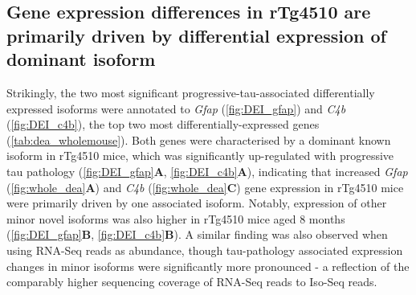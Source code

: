 \subsection{Gene expression differences in rTg4510 are primarily driven by differential expression of dominant isoform}
Strikingly, the two most significant progressive-tau-associated differentially expressed isoforms were annotated to \textit{Gfap} (\cref{fig:DEI_gfap}) and \textit{C4b} (\cref{fig:DEI_c4b}), the top two most differentially-expressed genes (\cref{tab:dea_wholemouse}). Both genes were characterised by a dominant known isoform in rTg4510 mice, which was significantly up-regulated with progressive tau pathology (\cref{fig:DEI_gfap}\textbf{A}, \cref{fig:DEI_c4b}\textbf{A}), indicating that increased \textit{Gfap} (\cref{fig:whole_dea}\textbf{A}) and \textit{C4b} (\cref{fig:whole_dea}\textbf{C}) gene expression in rTg4510 mice were primarily driven by one associated isoform. Notably, expression of other minor novel isoforms was also higher in rTg4510 mice aged 8 months (\cref{fig:DEI_gfap}\textbf{B}, \cref{fig:DEI_c4b}\textbf{B}). A similar finding was also observed when using RNA-Seq reads as abundance, though tau-pathology associated expression changes in minor isoforms were significantly more pronounced - a reflection of the comparably higher sequencing coverage of RNA-Seq reads to Iso-Seq reads. 


